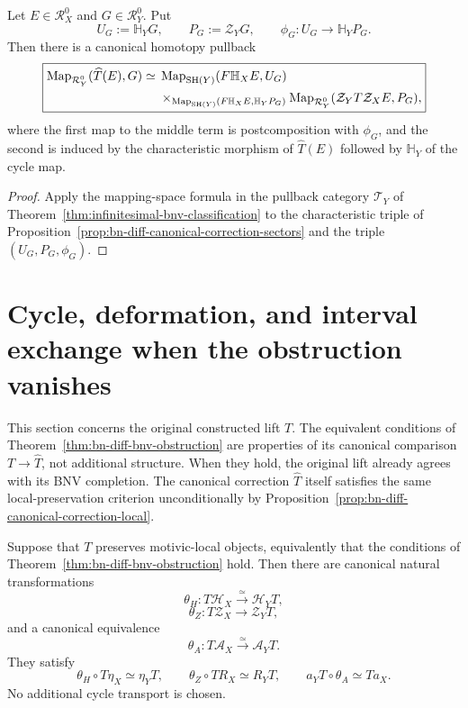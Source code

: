 \begin{theorem}
\label{thm:bn-diff-correction-mapping-space}
Let \(E\in\mathcal R_X^0\) and \(G\in\mathcal R_Y^0\).  Put
\[
  U_G:=\mathbb H_YG,
  \qquad
  P_G:=\mathcal Z_YG,
  \qquad
  \phi_G:U_G\to\mathbb H_YP_G.
\]
Then there is a canonical homotopy pullback
\[
\boxed{
\begin{aligned}
\operatorname{Map}_{\mathcal R_Y^0}(\widehat T(E),G)
\simeq{}&
\operatorname{Map}_{\mathrm{SH}(Y)}(F\mathbb H_XE,U_G)
\\
&\times_{
\operatorname{Map}_{\mathrm{SH}(Y)}(F\mathbb H_XE,\mathbb H_YP_G)
}
\operatorname{Map}_{\mathcal R_Y^0}
(\mathcal Z_YT\mathcal Z_XE,P_G),
\end{aligned}}
\]
where the first map to the middle term is postcomposition with \(\phi_G\), and
the second is induced by the characteristic morphism of
\(\widehat T(E)\) followed by \(\mathbb H_Y\) of the cycle map.
\end{theorem}

\begin{proof}
Apply the mapping-space formula in the pullback category
\(\mathcal T_Y\) of Theorem~\ref{thm:infinitesimal-bnv-classification} to the
characteristic triple of
Proposition~\ref{prop:bn-diff-canonical-correction-sectors} and the triple
\((U_G,P_G,\phi_G)\).
\end{proof}

\section{Cycle, deformation, and interval exchange when the obstruction vanishes}
\label{sec:bn-diff-bnv-exchange-from-defect}

This section concerns the original constructed lift \(T\).  The equivalent
conditions of Theorem~\ref{thm:bn-diff-bnv-obstruction} are properties of its
canonical comparison \(T\to\widehat T\), not additional structure.  When they
hold, the original lift already agrees with its BNV completion.  The canonical
correction \(\widehat T\) itself satisfies the same local-preservation
criterion unconditionally by
Proposition~\ref{prop:bn-diff-canonical-correction-local}.

\begin{proposition}
\label{prop:bn-diff-bnv-exchanges-from-local-preservation}
Suppose that \(T\) preserves motivic-local objects, equivalently that the
conditions of Theorem~\ref{thm:bn-diff-bnv-obstruction} hold.  Then there are
canonical natural transformations
\[
  \theta_H:
  T\mathcal H_X
  \xrightarrow{\simeq}
  \mathcal H_YT,
\]
\[
  \theta_Z:
  T\mathcal Z_X
  \longrightarrow
  \mathcal Z_YT,
\]
and a canonical equivalence
\[
  \boxed{
  \theta_A:
  T\mathcal A_X
  \xrightarrow{\simeq}
  \mathcal A_YT.
  }
\]
They satisfy
\[
  \theta_H\circ T\eta_X\simeq\eta_YT,
  \qquad
  \theta_Z\circ TR_X\simeq R_YT,
  \qquad
  a_YT\circ\theta_A\simeq Ta_X.
\]
No additional cycle transport is chosen.
\end{proposition}

